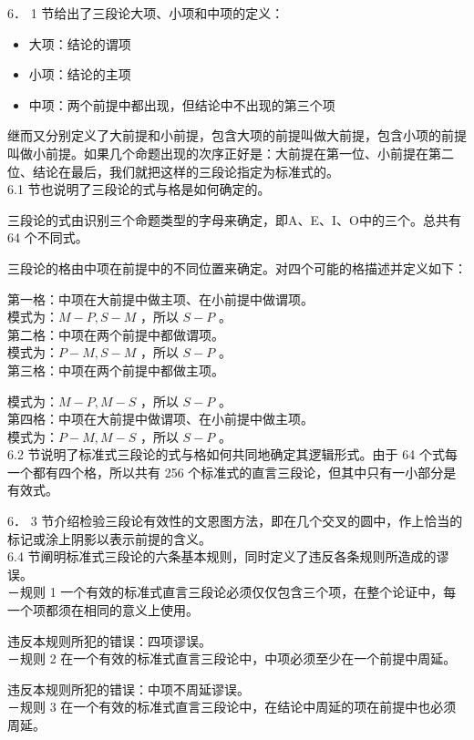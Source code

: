 6． 1 节给出了三段论大项、小项和中项的定义：

\begin{itemize}
  \item 大项：结论的谓项
  \item 小项：结论的主项
  \item 中项：两个前提中都出现，但结论中不出现的第三个项
\end{itemize}

继而又分别定义了大前提和小前提，包含大项的前提叫做大前提，包含小项的前提叫做小前提。如果几个命题出现的次序正好是：大前提在第一位、小前提在第二位、结论在最后，我们就把这样的三段论指定为标准式的。\\
6.1 节也说明了三段论的式与格是如何确定的。

三段论的式由识别三个命题类型的字母来确定，即A、E、I、O中的三个。总共有 64 个不同式。

三段论的格由中项在前提中的不同位置来确定。对四个可能的格描述并定义如下：

第一格：中项在大前提中做主项、在小前提中做谓项。\\
模式为：$M-P, S-M$ ，所以 $S-P$ 。\\
第二格：中项在两个前提中都做谓项。\\
模式为：$P-M, S-M$ ，所以 $S-P$ 。\\
第三格：中项在两个前提中都做主项。

模式为：$M-P, M-S$ ，所以 $S-P$ 。\\
第四格：中项在大前提中做谓项、在小前提中做主项。\\
模式为：$P-M, M-S$ ，所以 $S-P$ 。\\
6.2 节说明了标准式三段论的式与格如何共同地确定其逻辑形式。由于 64 个式每一个都有四个格，所以共有 256 个标准式的直言三段论，但其中只有一小部分是有效式。

6． 3 节介绍检验三段论有效性的文恩图方法，即在几个交叉的圆中，作上恰当的标记或涂上阴影以表示前提的含义。\\
6.4 节阐明标准式三段论的六条基本规则，同时定义了违反各条规则所造成的谬误。\\
－规则 1 一个有效的标准式直言三段论必须仅仅包含三个项，在整个论证中，每一个项都须在相同的意义上使用。

违反本规则所犯的错误：四项谬误。\\
－规则 2 在一个有效的标准式直言三段论中，中项必须至少在一个前提中周延。

违反本规则所犯的错误：中项不周延谬误。\\
－规则 3 在一个有效的标准式直言三段论中，在结论中周延的项在前提中也必须周延。

